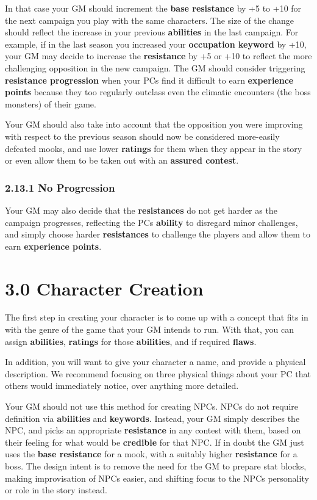 \documentclass[
  11pt,
]{article}
\begin{document}
In that case your GM should increment the \textbf{base resistance} by +5
to +10 for the next campaign you play with the same characters. The size
of the change should reflect the increase in your previous
\textbf{abilities} in the last campaign. For example, if in the last
season you increased your \textbf{occupation keyword} by +10, your GM
may decide to increase the \textbf{resistance} by +5 or +10 to reflect
the more challenging opposition in the new campaign. The GM should
consider triggering \textbf{resistance progression} when your PCs find
it difficult to earn \textbf{experience points} because they too
regularly outclass even the climatic encounters (the boss monsters) of
their game.

Your GM should also take into account that the opposition you were
improving with respect to the previous season should now be considered
more-easily defeated mooks, and use lower \textbf{ratings} for them when
they appear in the story or even allow them to be taken out with an
\textbf{assured contest}.

\hypertarget{no-progression}{%
\subsubsection{2.13.1 No Progression}\label{no-progression}}

Your GM may also decide that the \textbf{resistances} do not get harder
as the campaign progresses, reflecting the PCs \textbf{ability} to
disregard minor challenges, and simply choose harder
\textbf{resistances} to challenge the players and allow them to earn
\textbf{experience points}.

\hypertarget{character-creation}{%
\section{3.0 Character Creation}\label{character-creation}}

The first step in creating your character is to come up with a concept
that fits in with the genre of the game that your GM intends to run.
With that, you can assign \textbf{abilities}, \textbf{ratings} for those
\textbf{abilities}, and if required \textbf{flaws}.

In addition, you will want to give your character a name, and provide a
physical description. We recommend focusing on three physical things
about your PC that others would immediately notice, over anything more
detailed.

Your GM should not use this method for creating NPCs. NPCs do not
require definition via \textbf{abilities} and \textbf{keywords}.
Instead, your GM simply describes the NPC, and picks an appropriate
\textbf{resistance} in any contest with them, based on their feeling for
what would be \textbf{credible} for that NPC. If in doubt the GM just
uses the \textbf{base resistance} for a mook, with a suitably higher
\textbf{resistance} for a boss. The design intent is to remove the need
for the GM to prepare stat blocks, making improvisation of NPCs easier,
and shifting focus to the NPCs personality or role in the story instead.
\end{document}
